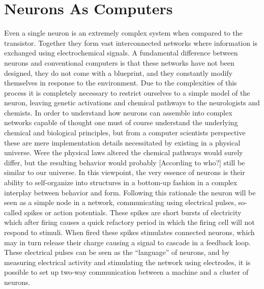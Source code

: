 \section{Neurons As Computers}
Even a single neuron is an extremely complex system when compared to the
transistor. Together they form vast interconnected networks where information is
exchanged using electrochemical signals. A fundamental difference between
neurons and conventional computers is that these networks have not been
designed, they do not come with a blueprint, and they constantly modify
themselves in response to the environment. Due to the complexities of this
process it is completely necessary to restrict ourselves to a simple model of
the neuron, leaving genetic activations and chemical pathways to the
neurologists and chemists. In order to understand how neurons can assemble into
complex networks capable of thought one must of course understand the underlying
chemical and biological principles, but from a computer scientists perspective
these are mere implementation details necessitated by existing in a physical
universe. Were the physical laws altered the chemical pathways would surely
differ, but the resulting behavior would probably [According to who?] still be
similar to our universe. In this viewpoint, the very essence of neurons is their
ability to self-organize into structures in a bottom-up fashion in a complex
interplay between behavior and form. Following this rationale the neuron will be
seen as a simple node in a network, communicating using electrical pulses,
so-called spikes or action potentials. These spikes are short bursts of
electricity which after firing causes a quick refactory period in which the
firing cell will not respond to stimuli.
When fired these spikes stimulates connected neurons, which may in turn
release their charge causing a signal to cascade in a feedback loop.
These electrical pulses can be seen as the ``language'' of neurons, and by
measuring electrical activity and stimulating the network using electrodes, it
is possible to set up two-way communication between a machine and a cluster of
neurons.
\cleardoublepage

